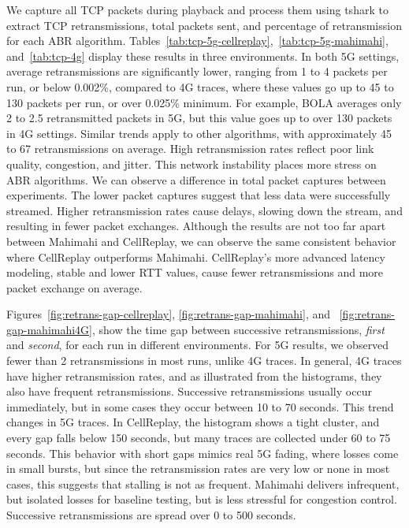 We capture all TCP packets during playback and process them using tshark to extract TCP retransmissions, total packets sent, and percentage of retransmission for each ABR algorithm. Tables~\ref{tab:tcp-5g-cellreplay},~\ref{tab:tcp-5g-mahimahi}, and~\ref{tab:tcp-4g} display these results in three environments. In both 5G settings, average retransmissions are significantly lower, ranging from 1 to 4 packets per run, or below 0.002\%, compared to 4G traces, where these values go up to 45 to 130 packets per run, or over 0.025\% minimum. For example, BOLA averages only 2 to 2.5 retransmitted packets in 5G, but this value goes up to over 130 packets in 4G settings. Similar trends apply to other algorithms, with approximately 45 to 67 retransmissions on average. High retransmission rates reflect poor link quality, congestion, and jitter. This network instability places more stress on ABR algorithms. We can observe a difference in total packet captures between experiments. The lower packet captures suggest that less data were successfully streamed. Higher retransmission rates cause delays, slowing down the stream, and resulting in fewer packet exchanges. Although the results are not too far apart between Mahimahi and CellReplay, we can observe the same consistent behavior where CellReplay outperforms Mahimahi. CellReplay's more advanced latency modeling, stable and lower RTT values, cause fewer retransmissions and more packet exchange on average.

Figures~\ref{fig:retrans-gap-cellreplay}, \ref{fig:retrans-gap-mahimahi}, and ~\ref{fig:retrans-gap-mahimahi4G}, show the time gap between successive retransmissions, \emph{first} and \emph{second}, for each run in different environments. For 5G results, we observed fewer than 2 retransmissions in most runs, unlike 4G traces. In general, 4G traces have higher retransmission rates, and as illustrated from the histograms, they also have frequent retransmissions. Successive retransmissions usually occur immediately, but in some cases they occur between 10 to 70 seconds. This trend changes in 5G traces. In CellReplay, the histogram shows a tight cluster, and every gap falls below 150 seconds, but many traces are collected under 60 to 75 seconds. This behavior with short gaps mimics real 5G fading, where losses come in small bursts, but since the retransmission rates are very low or none in most cases, this suggests that stalling is not as frequent. Mahimahi delivers infrequent, but isolated losses for baseline testing, but is less stressful for congestion control. Successive retransmissions are spread over 0 to 500 seconds.

